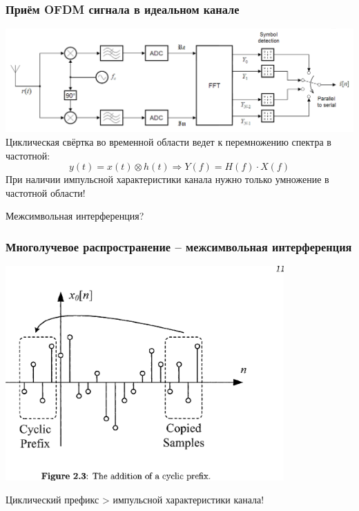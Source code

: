 \documentclass[utf8]{beamer}
\begin{document}
\begin{frame}
\frametitle{Приём OFDM сигнала в идеальном канале}
\includegraphics[width=\textwidth]{pic/OFDM_receiver_ideal.png}
\newline
Циклическая свёртка во временной области ведет к перемножению спектра в частотной:
$$
 y(t) = x(t)\otimes h(t) \Rightarrow Y(f) = H(f)\cdot X(f)
$$
При наличии импульсной характеристики канала нужно только умножение в частотной области!

Межсимвольная интерференция?
\end{frame}
\begin{frame}
\frametitle{Многолучевое распространение -- межсимвольная интерференция}
\begin{center}
\includegraphics[width=0.8\textwidth]{pic/cyclic-prefix.png}
\end{center}
Циклический префикс > импульсной характеристики канала!
\end{frame}
\end{document}
